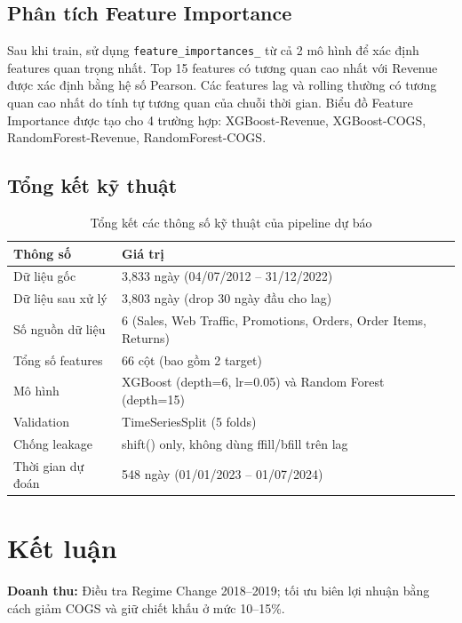 \documentclass{article}
\begin{document}
\subsection{Phân tích Feature Importance}

Sau khi train, sử dụng \texttt{feature\_importances\_} từ cả 2 mô hình để xác định features quan trọng nhất. Top 15 features có tương quan cao nhất với Revenue được xác định bằng hệ số Pearson. Các features lag và rolling thường có tương quan cao nhất do tính tự tương quan của chuỗi thời gian. Biểu đồ Feature Importance được tạo cho 4 trường hợp: XGBoost-Revenue, XGBoost-COGS, RandomForest-Revenue, RandomForest-COGS.

\subsection{Tổng kết kỹ thuật}

\begin{table}[H]
  \caption{Tổng kết các thông số kỹ thuật của pipeline dự báo}
  \label{tab:tech_summary}
  \centering
  \begin{tabular}{ll}
    \toprule
    Thông số & Giá trị \\
    \midrule
    Dữ liệu gốc & 3{,}833 ngày (04/07/2012 -- 31/12/2022) \\
    Dữ liệu sau xử lý & 3{,}803 ngày (drop 30 ngày đầu cho lag) \\
    Số nguồn dữ liệu & 6 (Sales, Web Traffic, Promotions, Orders, Order Items, Returns) \\
    Tổng số features & 66 cột (bao gồm 2 target) \\
    Mô hình & XGBoost (depth=6, lr=0.05) và Random Forest (depth=15) \\
    Validation & TimeSeriesSplit (5 folds) \\
    Chống leakage & shift() only, không dùng ffill/bfill trên lag \\
    Thời gian dự đoán & 548 ngày (01/01/2023 -- 01/07/2024) \\
    \bottomrule
  \end{tabular}
\end{table}

\section{Kết luận}

\textbf{Doanh thu:} Điều tra Regime Change 2018--2019; tối ưu biên lợi nhuận bằng cách giảm COGS và giữ chiết khấu ở mức 10--15\%.
\end{document}
